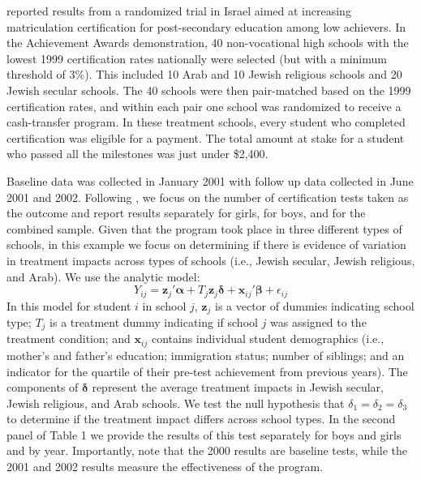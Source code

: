 \documentclass[12pt]{article}
\newcommand{\bm}{\mathbf}
\newcommand{\bs}{\boldsymbol}
\begin{document}
\citet{Angrist2009effects} reported results from a randomized trial in Israel aimed at increasing matriculation certification for post-secondary education among low achievers. 
In the Achievement Awards demonstration, 40 non-vocational high schools with the lowest 1999 certification rates nationally were selected (but with a  minimum threshold of 3\%). This included 10 Arab and 10 Jewish religious schools and 20 Jewish secular schools. The 40 schools were then pair-matched based on the 1999 certification rates, and within each pair one school was randomized to receive a cash-transfer program. In these treatment schools, every student who completed certification was eligible for a payment. The total amount at stake for a student who passed all the milestones was just under \$2,400.   

Baseline data was collected in January 2001 with follow up data collected in June 2001 and 2002. Following \citet{Angrist2009effects}, we focus on the number of certification tests taken as the outcome and report results separately for girls, for boys, and for the combined sample. Given that the program took place in three different types of schools, in this example we focus on determining if there is evidence of variation in treatment impacts across types of schools (i.e., Jewish secular, Jewish religious, and Arab). We use the analytic model:
\begin{equation}
Y_{ij} = \bm{z}_j'\bs\alpha + T_j \bm{z}_j \bs\delta + \bm{x}_{ij}'\bs\beta + \epsilon_{ij}
\end{equation}
In this model for student $i$ in school $j$, $\bm{z}_j$ is a vector of dummies indicating school type; $T_j$ is a treatment dummy indicating if school $j$ was assigned to the treatment condition; and $\bm{x}_{ij}$ contains individual student demographics (i.e., mother’s and father’s education; immigration status; number of siblings; and an indicator for the quartile of their pre-test achievement from previous years). The components of $\bs\delta$ represent the average treatment impacts in Jewish secular, Jewish religious, and Arab schools. We test the null hypothesis that $\delta_1 = \delta_2 = \delta_3$ to determine if the treatment impact differs across school types. In the second panel of Table 1 we provide the results of this test separately for boys and girls and by year. Importantly, note that the 2000 results are baseline tests, while the 2001 and 2002 results measure the effectiveness of the program. 
\end{document}
